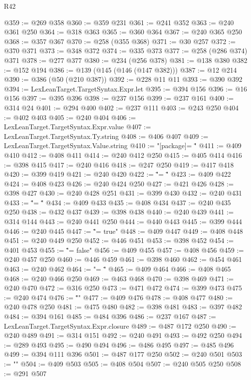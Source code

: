 \begin{lexlean}{R42}
\begin{coremodule}
@359 := @269 @358
@360 := @359 @231
@361 := @241 @352
@363 := @240 @361 @250
@364 := @318 @363
@365 := @360 @364
@367 := @240 @365 @250
@368 := @357 @367
@370 := @258 (@355 @368)
@371 := @30 @257
@372 := @370 @371
@373 := @348 @372
@374 := @335 @373
@377 := @258 (@286 @374) @371
@378 := @277 @377
@380 := @234 (@256 @378)
@381 := @138 @380
@382 := @152 @194
@386 := @139 (@145 (@146 (@147 @382)))
@387 := @12 @214
@390 := @386 (@50 (@210 @387))
@392 := @228 @11 @11
@393 := @390 @392
@394 := LexLeanTarget.TargetSyntax.Expr.let
@395 := @394 @156
@396 := @16 @156
@397 := @395 @396
@398 := @237 @156
@399 := @237 @161
@400 := @314 @24
@401 := @294 @400
@402 := @237 @111
@403 := @243 @250
@404 := @402 @403
@405 := @240 @404
@406 := LexLeanTarget.TargetSyntax.Expr.value
@407 := LexLeanTarget.TargetSyntax.Ty.string
@408 := @406 @407
@409 := LexLeanTarget.TargetSyntax.Value.string
@410 := "[package]\nname = \""
@411 := @409 @410
@412 := @408 @411
@414 := @240 @412 @250
@415 := @405 @414
@416 := @398 @415
@417 := @240 @416
@418 := @247 @250
@419 := @417 @418
@420 := @399 @419
@421 := @240 @420
@422 := "\"\nversion = \""
@423 := @409 @422
@424 := @408 @423
@426 := @240 @424 @250
@427 := @421 @426
@428 := @398 @427
@430 := @240 @428 @251
@431 := @399 @430
@432 := @240 @431
@433 := "\"\nedition = \""
@434 := @409 @433
@435 := @408 @434
@437 := @240 @435 @250
@438 := @432 @437
@439 := @398 @438
@440 := @240 @439
@441 := @314 @144
@443 := @240 @441 @250
@444 := @440 @443
@445 := @399 @444
@446 := @240 @445
@447 := "\"\npublish = true"
@448 := @409 @447
@449 := @408 @448
@451 := @240 @449 @250
@452 := @446 @451
@453 := @398 @452
@454 := @401 @453
@455 := "\"\npublish = false"
@456 := @409 @455
@457 := @408 @456
@459 := @240 @457 @250
@460 := @446 @459
@461 := @398 @460
@462 := @454 @461
@463 := @240 @462
@464 := "\n\n[lib]\npath = \""
@465 := @409 @464
@466 := @408 @465
@468 := @240 @466 @250
@469 := @463 @468
@470 := @398 @469
@471 := @240 @470
@472 := @316 @250
@473 := @471 @472
@474 := @399 @473
@475 := @240 @474
@476 := "\"\n{}\n"
@477 := @409 @476
@478 := @408 @477
@480 := @240 @478 @250
@481 := @475 @480
@482 := @398 @481
@483 := @397 @482
@484 := @394 @161
@485 := @484 @396
@486 := @237 @167
@487 := LexLeanTarget.TargetSyntax.Expr.closure
@489 := @487 @172 @250
@490 := @240 @489
@491 := @314 @151
@492 := @240 @491
@493 := @492 @250
@494 := @289 @493
@495 := @490 @494
@496 := @486 @495
@497 := @485 @496
@499 := @394 @111 @396
@501 := @487 @177 @250
@502 := @240 @501
@503 := "\n"
@504 := @409 @503
@505 := @408 @504
@507 := @240 @505 @250
@508 := @291 @507

\end{coremodule}
\end{lexlean}
